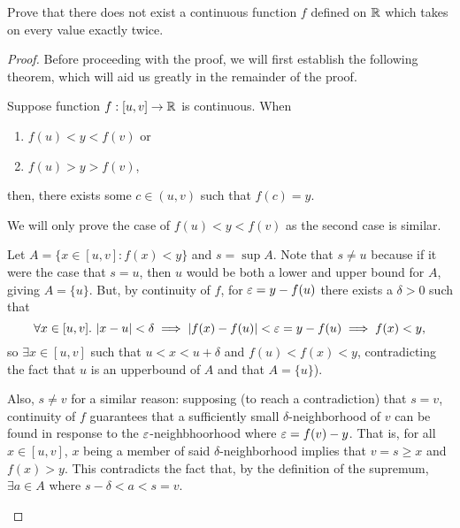 \begin{problem}
  Prove that there does not exist a continuous function $f$ defined on $\mathbb{R}$ which takes on every value exactly twice.

  \begin{proof}
    Before proceeding with the proof, we will first establish the following
    theorem, which will aid us greatly in the remainder of the proof.

    \begin{theorem}
      \label{thm:intermediate-value-theorem}
      Suppose function $f : [u, v] \to \mathbb{R}$ is continuous. When 
      \begin{enumerate}[label=(\alph*)]
        \item $f(u) < y < f(v)$ or
        \item $f(u) > y > f(v)$,
      \end{enumerate}
      then, there exists some $c \in (u, v)$ such that $f(c) = y$.
    \end{theorem}

    \begin{subproof}
      We will only prove the case of $f(u) < y < f(v)$ as the second case is similar.

      Let $A = \{ x \in [u,v] : f(x) < y \}$ and $s = \sup{A}$.
      Note that $s \neq u$ because if it were the case that $s = u$, then $u$ would be both a lower and upper bound for $A$,
      giving $A = \{ u \}$. But, by continuity of $f$, for $\varepsilon = y - f(u)$ there exists a $\delta > 0$
      such that
      \[
        \forall x \in [u, v].\, \left\lvert x - u \right\rvert < \delta \implies \left\lvert f(x) - f(u) \right\rvert < \varepsilon = y - f(u) \implies f(x) < y,
      \]
      so $\exists x \in [u, v]$ such that $u < x < u + \delta$ and $f(u) < f(x) < y$, contradicting the fact that $u$
      is an upperbound of $A$ and that $A = \{ u \}$).

      Also, $s \neq v$ for a similar reason: supposing (to reach a contradiction) that $s = v$, continuity of $f$ guarantees that a sufficiently small $\delta$-neighborhood of $v$
      can be found in response to the $\varepsilon$-neighbhoorhood where $\varepsilon = f(v) - y$. That is, for all $x \in [u, v]$,
      $x$ being a member of said $\delta$-neighborhood implies that $v = s \geq x$ and $f(x) > y$. This contradicts the fact
      that, by the definition of the supremum, $\exists a \in A$ where $s - \delta < a < s = v$.


\end{subproof}
\end{proof}
\end{problem}
